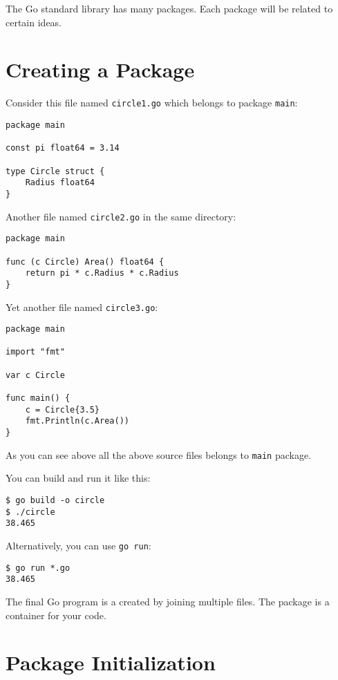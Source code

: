 The Go standard library has many packages. Each package will be
related to certain ideas.

\section{Creating a Package}

Consider this file named \texttt{circle1.go} which belongs to
package \texttt{main}:

\begin{lstlisting}
package main

const pi float64 = 3.14

type Circle struct {
    Radius float64
}
\end{lstlisting}

Another file named \texttt{circle2.go} in the same directory:

\begin{lstlisting}
package main

func (c Circle) Area() float64 {
    return pi * c.Radius * c.Radius
}
\end{lstlisting}

Yet another file named \texttt{circle3.go}:

\begin{lstlisting}
package main

import "fmt"

var c Circle

func main() {
    c = Circle{3.5}
    fmt.Println(c.Area())
}
\end{lstlisting}

As you can see above all the above source files belongs
to \texttt{main} package.

You can build and run it like this:

\begin{lstlisting}[numbers=none]
$ go build -o circle
$ ./circle
38.465
\end{lstlisting}

Alternatively, you can use \texttt{go run}:

\begin{lstlisting}[numbers=none]
$ go run *.go
38.465
\end{lstlisting}

The final Go program is a created by joining multiple files.  The
package is a container for your code.

\section{Package Initialization}

